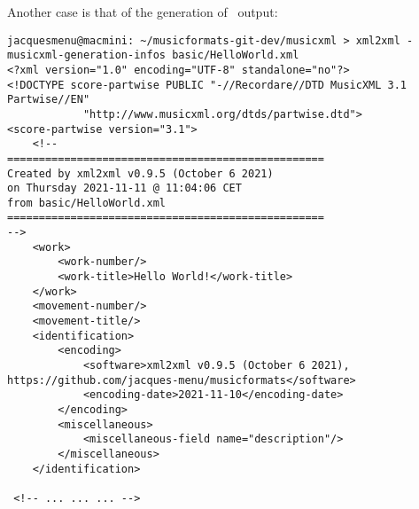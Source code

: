 Another case is that of the generation of \mxml\ output:
\begin{lstlisting}[language=Terminal]
jacquesmenu@macmini: ~/musicformats-git-dev/musicxml > xml2xml -musicxml-generation-infos basic/HelloWorld.xml
<?xml version="1.0" encoding="UTF-8" standalone="no"?>
<!DOCTYPE score-partwise PUBLIC "-//Recordare//DTD MusicXML 3.1 Partwise//EN"
			"http://www.musicxml.org/dtds/partwise.dtd">
<score-partwise version="3.1">
    <!--
==================================================
Created by xml2xml v0.9.5 (October 6 2021)
on Thursday 2021-11-11 @ 11:04:06 CET
from basic/HelloWorld.xml
==================================================
-->
    <work>
        <work-number/>
        <work-title>Hello World!</work-title>
    </work>
    <movement-number/>
    <movement-title/>
    <identification>
        <encoding>
            <software>xml2xml v0.9.5 (October 6 2021), https://github.com/jacques-menu/musicformats</software>
            <encoding-date>2021-11-10</encoding-date>
        </encoding>
        <miscellaneous>
            <miscellaneous-field name="description"/>
        </miscellaneous>
    </identification>

 <!-- ... ... ... -->
\end{lstlisting}

